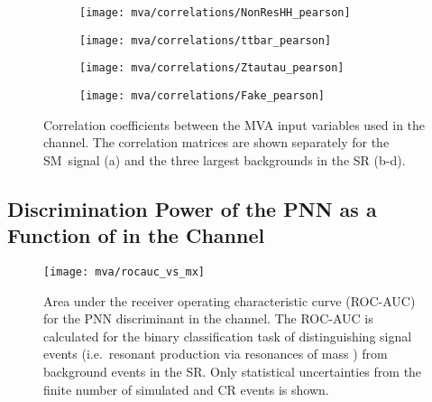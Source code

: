 \begin{figure}[htbp]
  \centering

  \begin{subfigure}[t]{.49\textwidth}
    \texttt{[image: mva/correlations/NonResHH\_pearson]}
  \end{subfigure}\hfill %
  \begin{subfigure}[t]{.49\textwidth}
    \texttt{[image: mva/correlations/ttbar\_pearson]}
  \end{subfigure}

  \begin{subfigure}[t]{.49\textwidth}
    \texttt{[image: mva/correlations/Ztautau\_pearson]}
  \end{subfigure}\hfill %
  \begin{subfigure}[t]{.49\textwidth}
    \texttt{[image: mva/correlations/Fake\_pearson]}
  \end{subfigure}

  \caption[Correlation coefficients between the MVA input variables used in the
  \hadhad channel.]{Correlation coefficients between the MVA input variables
    used in the \hadhad channel. The correlation matrices are shown separately
    for the SM~\HH signal (a) and the three largest backgrounds in the \hadhad
    SR (b-d).}%
  \label{fig:mva_input_correlations}
\end{figure}


\clearpage
\subsection{Discrimination Power of the PNN as a Function of \mX in the \hadhad
  Channel}%
\label{app:pnn_rocauc_vs_mx}

\begin{figure}[htbp]
  \centering

  \texttt{[image: mva/rocauc\_vs\_mx]}

  \caption[ROC-AUC for the PNN discriminant as a function of \mX in the \hadhad
  channel.]{Area under the receiver operating characteristic curve (ROC-AUC) for
    the PNN discriminant in the \hadhad channel. The ROC-AUC is calculated for
    the binary classification task of distinguishing signal events (i.e.\
    resonant \HH production via resonances of mass \mX) from background events
    in the \hadhad SR. Only statistical uncertainties from the finite number of
    simulated and CR events is shown.}%
  \label{fig:pnn_rocauc_vs_mx}
\end{figure}


